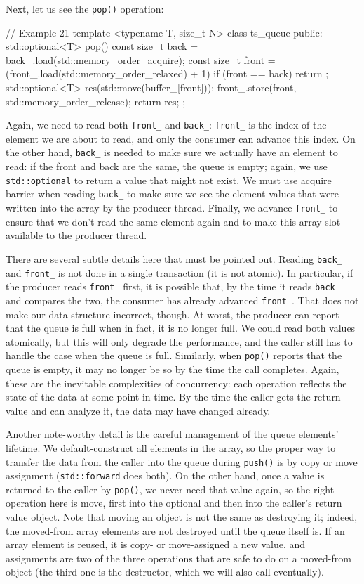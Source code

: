 Next, let us see the \texttt{pop()} operation:

\begin{code}
// Example 21
template <typename T, size_t N> class ts_queue {
  public:
  std::optional<T> pop() {
    const size_t back =
      back_.load(std::memory_order_acquire);
    const size_t front =
     (front_.load(std::memory_order_relaxed) + 1) %
    if (front == back) return {};
    std::optional<T> res(std::move(buffer_[front]));
    front_.store(front, std::memory_order_release);
    return res;
  }
};
\end{code}

Again, we need to read both \texttt{front\_} and \texttt{back\_}: \texttt{front\_} is the index of the element we are about to read, and only the consumer can advance this index. On the other hand, \texttt{back\_} is needed to make sure we actually have an element to read: if the front and back are the same, the queue is empty; again, we use \texttt{std::optional} to return a value that might not exist. We must use acquire barrier when reading \texttt{back\_} to make sure we see the element values that were written into the array by the producer thread. Finally, we advance \texttt{front\_} to ensure that we don't read the same element again and to make this array slot available to the producer thread.

There are several subtle details here that must be pointed out. Reading \texttt{back\_} and \texttt{front\_} is not done in a single transaction (it is not atomic). In particular, if the producer reads \texttt{front\_} first, it is possible that, by the time it reads \texttt{back\_} and compares the two, the consumer has already advanced \texttt{front\_}. That does not make our data structure incorrect, though. At worst, the producer can report that the queue is full when in fact, it is no longer full. We could read both values atomically, but this will only degrade the performance, and the caller still has to handle the case when the queue is full. Similarly, when \texttt{pop()} reports that the queue is empty, it may no longer be so by the time the call completes. Again, these are the inevitable complexities of concurrency: each operation reflects the state of the data at some point in time. By the time the caller gets the return value and can analyze it, the data may have changed already.

Another note-worthy detail is the careful management of the queue elements' lifetime. We default-construct all elements in the array, so the proper way to transfer the data from the caller into the queue during \texttt{push()} is by copy or move assignment (\texttt{std::forward} does both). On the other hand, once a value is returned to the caller by \texttt{pop()}, we never need that value again, so the right operation here is move, first into the optional and then into the caller's return value object. Note that moving an object is not the same as destroying it; indeed, the moved-from array elements are not destroyed until the queue itself is. If an array element is reused, it is copy- or move-assigned a new value, and assignments are two of the three operations that are safe to do on a moved-from object (the third one is the destructor, which we will also call eventually).

